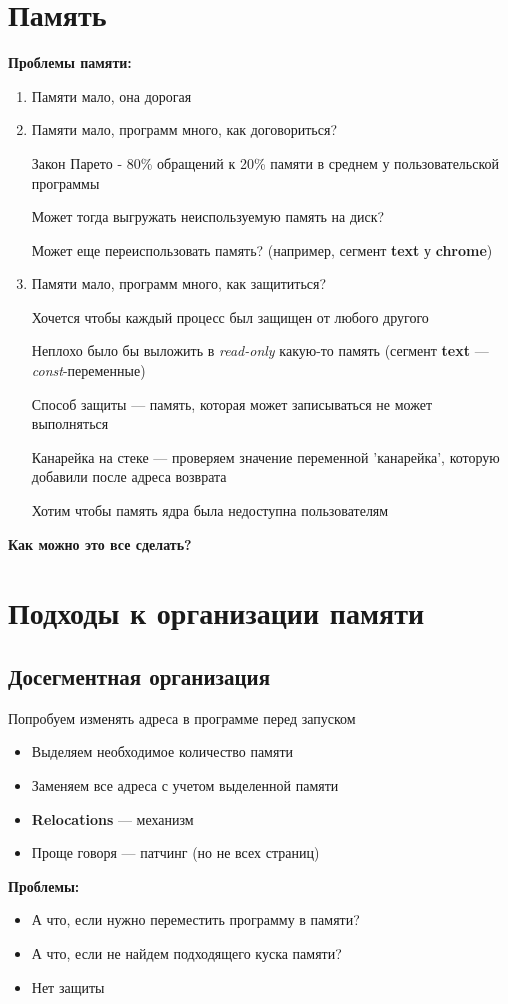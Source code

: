 \documentclass[../../lectures.tex]{subfiles}
\begin{document}
\section{Память}
\textbf{Проблемы памяти:}
\begin{enumerate}
    \item Памяти мало, она дорогая
    \item Памяти мало, программ много, как договориться?

          Закон Парето - 80\% обращений к 20\% памяти в среднем у пользовательской программы

          Может тогда выгружать неиспользуемую память на диск?

          Может еще переиспользовать память? (например, сегмент \textbf{text} у \textbf{chrome})
    \item Памяти мало, программ много, как защититься?

          Хочется чтобы каждый процесс был защищен от любого другого

          Неплохо было бы выложить в \emph{read-only} какую-то память 
          (сегмент \textbf{text} --- \emph{const}-переменные)


          Способ защиты --- память, которая может записываться не может выполняться

          Канарейка на стеке --- проверяем значение переменной 'канарейка', которую добавили после адреса возврата

          Хотим чтобы память ядра была недоступна пользователям
\end{enumerate}
\begin{center}\textbf{Как можно это все сделать?}\end{center}

\newpage
\section{Подходы к организации памяти}
\subsection{Досегментная организация}
Попробуем изменять адреса в программе перед запуском
\begin{itemize}
    \item Выделяем необходимое количество памяти
    \item Заменяем все адреса с учетом выделенной памяти
    \item \textbf{Relocations} --- механизм 
    \item Проще говоря --- патчинг (но не всех страниц)
\end{itemize}
\textbf{Проблемы:}
\begin{itemize}
    \item А что, если нужно переместить программу в памяти?
    \item А что, если не найдем подходящего куска памяти?
    \item Нет защиты
\end{itemize}
\end{document}
